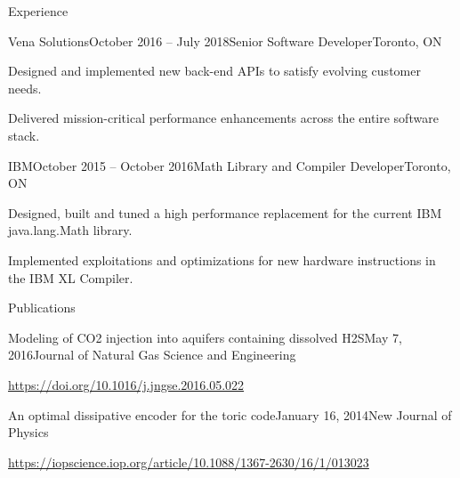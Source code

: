 \documentclass{resume} %
\begin{document}
\begin{rSection}{Experience}

\begin{rSubsection}{Vena Solutions}{October 2016 -- July 2018}{Senior Software Developer}{Toronto, ON}
\item Designed and implemented new back-end APIs to satisfy evolving customer needs.
\item Delivered mission-critical performance enhancements across the entire software stack.
\end{rSubsection}


\begin{rSubsection}{IBM}{October 2015 -- October 2016}{Math Library and Compiler Developer}{Toronto, ON}
\item Designed, built and tuned a high performance replacement for the current IBM java.lang.Math library.
\item Implemented exploitations and optimizations for new hardware instructions in the IBM XL Compiler.
\end{rSubsection}

\end{rSection}


\begin{rSection}{Publications}

\begin{rSubsection}{Modeling of CO2 injection into aquifers containing dissolved H2S}{May 7, 2016}{Journal of Natural Gas Science and Engineering}{}
\item \href{https://doi.org/10.1016/j.jngse.2016.05.022}{https://doi.org/10.1016/j.jngse.2016.05.022}
\end{rSubsection}

\begin{rSubsection}{An optimal dissipative encoder for the toric code}{January 16, 2014}{New Journal of Physics}{}
\item \href{https://iopscience.iop.org/article/10.1088/1367-2630/16/1/013023}{https://iopscience.iop.org/article/10.1088/1367-2630/16/1/013023}
\end{rSubsection}

\end{rSection}





\end{document}
